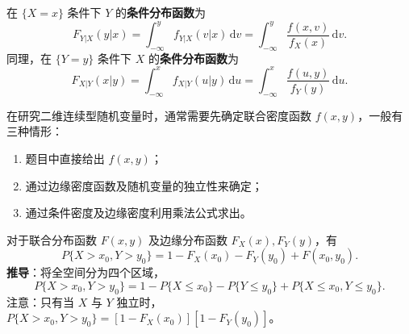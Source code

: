 ﻿\documentclass[lang=cn,11pt]{elegantbook}
\begin{document}
\begin{definition}[条件分布函数]\label{def:conditional-df} 
在 $\{X=x\}$ 条件下 $Y$ 的\textbf{条件分布函数}为
\[
F_{Y|X}(y|x) = \int_{-\infty}^{y}f_{Y|X}(v|x)\,\mathrm{d}v = \int_{-\infty}^{y}\frac{f(x,v)}{f_X(x)}\,\mathrm{d}v.
\]
同理，在 $\{Y=y\}$ 条件下 $X$ 的\textbf{条件分布函数}为
\[
F_{X|Y}(x|y) = \int_{-\infty}^{x}f_{X|Y}(u|y)\,\mathrm{d}u = \int_{-\infty}^{x}\frac{f(u,y)}{f_Y(y)}\,\mathrm{d}u.
\]
\end{definition}

\begin{note}
在研究二维连续型随机变量时，通常需要先确定联合密度函数 $f(x,y)$，一般有三种情形：
\begin{enumerate}
    \item 题目中直接给出 $f(x,y)$；
    \item 通过边缘密度函数及随机变量的独立性来确定；
    \item 通过条件密度及边缘密度利用乘法公式求出。
\end{enumerate}
\end{note}


\begin{property}[区域概率公式]\label{prop:region-prob}
对于联合分布函数 $F(x,y)$ 及边缘分布函数 $F_X(x), F_Y(y)$，有
\[
P\{X > x_0, Y > y_0\} = 1 - F_X(x_0) - F_Y(y_0) + F(x_0, y_0).
\]
\textbf{推导}：将全空间分为四个区域，
\[
P\{X > x_0, Y > y_0\} = 1 - P\{X \leqslant x_0\} - P\{Y \leqslant y_0\} + P\{X \leqslant x_0, Y \leqslant y_0\}.
\]
注意：只有当 $X$ 与 $Y$ 独立时，$P\{X > x_0, Y > y_0\} = [1-F_X(x_0)][1-F_Y(y_0)]$。
\end{property}
\end{document}
